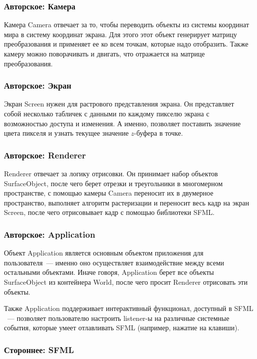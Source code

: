 \documentclass{article}
\begin{document}
\subsubsection{Авторское: Камера}

Камера Camera отвечает за то, чтобы переводить объекты из системы координат мира в систему координат экрана. Для этого этот объект генерирует матрицу преобразования и применяет ее ко всем точкам, которые надо отобразить. Также камеру можно поворачивать и двигать, что отражается на матрице преобразования.

\subsubsection{Авторское: Экран}

Экран Screen нужен для растрового представления экрана. Он представляет собой несколько табличек с данными по каждому пикселю экрана с возможностью доступа и изменения. А именно, позволяет поставить значение цвета пикселя и узнать текущее значение $z$-буфера в точке.

\subsubsection{Авторское: Renderer}

Renderer отвечает за логику отрисовки. Он принимает набор объектов SurfaceObject, после чего берет отрезки и треугольники в многомерном пространстве, с помощью камеры Camera переносит их в двумерное пространство, выполняет алгоритм растеризации и переносит весь кадр на экран Screen, после чего отрисовывает кадр с помощью библиотеки SFML. 

\subsubsection{Авторское: Application}

Объект Application является основным объектом приложения для пользователя~--- именно оно осуществляет взаимодействие между всеми остальными объектами. Иначе говоря, Application берет все объекты SurfaceObject из контейнера World, после чего просит Renderer отрисовать эти объекты.

Также Application поддерживает интерактивный функционал, доступный в SFML ~--- позволяет пользователю настроить listener-ы на различные системные события, которые умеет отлавливать SFML (например, нажатие на клавиши).

\subsubsection{Стороннее: SFML}
\end{document}
